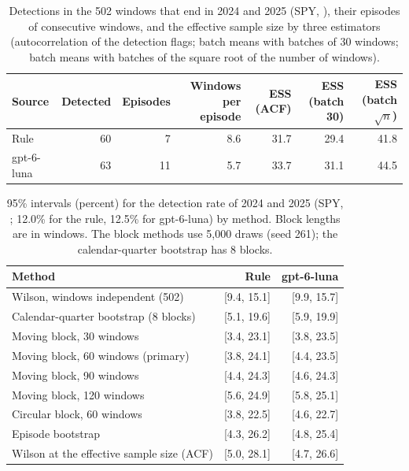 \begin{table}[H]
\centering
\caption{Detections in the 502 windows that end in 2024 and 2025 (SPY, ), their episodes of consecutive windows, and the effective sample size by three estimators (autocorrelation of the detection flags; batch means with batches of 30 windows; batch means with batches of the square root of the number of windows).}
\label{tab:stored:ess}
\footnotesize
\begin{tabular}{@{}lrrrrrr@{}}
\toprule
Source & Detected & Episodes & Windows per episode & ESS (ACF) & ESS (batch 30) & ESS (batch $\sqrt{n}$) \\
\midrule
Rule & 60 & 7 & 8.6 & 31.7 & 29.4 & 41.8 \\
gpt-6-luna & 63 & 11 & 5.7 & 33.7 & 31.1 & 44.5 \\
\bottomrule
\end{tabular}
\end{table}

\begin{table}[H]
\centering
\caption{95\% intervals (percent) for the detection rate of 2024 and 2025 (SPY, ; 12.0\% for the rule, 12.5\% for gpt-6-luna) by method. Block lengths are in windows. The block methods use 5{,}000 draws (seed 261); the calendar-quarter bootstrap has 8 blocks.}
\label{tab:stored:intervals}
\footnotesize
\begin{tabular}{@{}lrr@{}}
\toprule
Method & Rule & gpt-6-luna \\
\midrule
Wilson, windows independent (502) & [9.4, 15.1] & [9.9, 15.7] \\
Calendar-quarter bootstrap (8 blocks) & [5.1, 19.6] & [5.9, 19.9] \\
Moving block, 30 windows & [3.4, 23.1] & [3.8, 23.5] \\
Moving block, 60 windows (primary) & [3.8, 24.1] & [4.4, 23.5] \\
Moving block, 90 windows & [4.4, 24.3] & [4.6, 24.3] \\
Moving block, 120 windows & [5.6, 24.9] & [5.8, 25.1] \\
Circular block, 60 windows & [3.8, 22.5] & [4.6, 22.7] \\
Episode bootstrap & [4.3, 26.2] & [4.8, 25.4] \\
Wilson at the effective sample size (ACF) & [5.0, 28.1] & [4.7, 26.6] \\
\bottomrule
\end{tabular}
\end{table}

